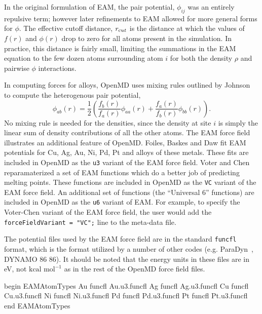 \documentclass[letterpaper]{report}
\begin{document}
In the original formulation of EAM\cite{Daw84}, the pair
potential, $\phi_{ij}$ was an entirely repulsive term; however later
refinements to EAM allowed for more general forms for
$\phi$.\cite{Daw89} The effective cutoff distance, $r_{{\text cut}}$
is the distance at which the values of $f(r)$ and $\phi(r)$ drop to
zero for all atoms present in the simulation.  In practice, this
distance is fairly small, limiting the summations in the EAM
equation to the few dozen atoms surrounding atom $i$ for both the
density $\rho$ and pairwise $\phi$ interactions.

In computing forces for alloys, OpenMD uses mixing rules outlined by
Johnson~\cite{johnson89} to compute the heterogenous pair potential,
\begin{equation}
\label{eq:johnson}
\phi_{ab}(r)=\frac{1}{2}\left(
\frac{f_{b}(r)}{f_{a}(r)}\phi_{aa}(r)+
\frac{f_{a}(r)}{f_{b}(r)}\phi_{bb}(r)
\right).
\end{equation}
No mixing rule is needed for the densities, since the density at site
$i$ is simply the linear sum of density contributions of all the other
atoms.
The EAM force field illustrates an additional feature of
OpenMD.  Foiles, Baskes and Daw fit EAM potentials for Cu, Ag,
Au, Ni, Pd, Pt and alloys of these metals.\cite{FBD86} These fits are
included in OpenMD as the {\tt u3} variant of the EAM force
field.  Voter and Chen reparamaterized a set of EAM functions
which do a better job of predicting melting points.\cite{Voter:87}
These functions are included in OpenMD as the {\tt VC} variant of
the EAM force field.  An additional set of functions (the
``Universal 6'' functions) are included in OpenMD as the {\tt u6}
variant of EAM.  For example, to specify the Voter-Chen variant
of the EAM force field, the user would add the {\tt
forceFieldVariant = "VC";} line to the meta-data file.

The potential files used by the EAM force field are in the
standard {\tt funcfl} format, which is the format utilized by
a number of other codes (e.g. ParaDyn~\cite{Paradyn}, DYNAMO 86
  86).  It should be noted that the energy units in these files are
in eV, not $\mbox{kcal mol}^{-1}$ as in the rest of the OpenMD
force field files.

\begin{code}[caption={[An example of a EAMAtomTypes block.] A
simple example of a EAMAtomTypes block. Here the only data provided is
the name of a DYNAMO86 {\tt funcfl} file which contains the raw data for spline
interpolations for the density, functional, and pair potential.},
label={sch:EAMAtomTypes}]
begin EAMAtomTypes
Au      funcfl  Au.u3.funcfl
Ag      funcfl  Ag.u3.funcfl
Cu      funcfl  Cu.u3.funcfl
Ni      funcfl  Ni.u3.funcfl
Pd      funcfl  Pd.u3.funcfl
Pt      funcfl  Pt.u3.funcfl
end EAMAtomTypes
\end{code}
\end{document}
